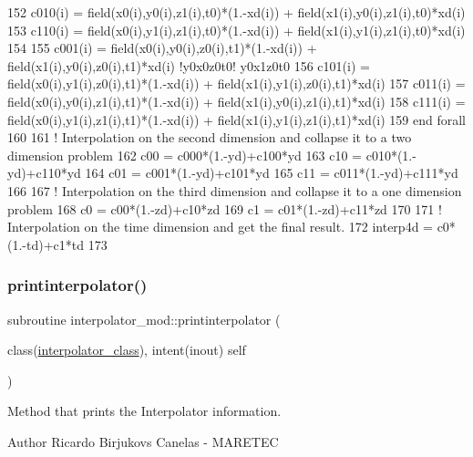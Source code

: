 \begin{DoxyCode}
152         c010(i) = field(x0(i),y0(i),z1(i),t0)*(1.-xd(i)) + field(x1(i),y0(i),z1(i),t0)*xd(i)
153         c110(i) = field(x0(i),y1(i),z1(i),t0)*(1.-xd(i)) + field(x1(i),y1(i),z1(i),t0)*xd(i)
154 
155         c001(i) = field(x0(i),y0(i),z0(i),t1)*(1.-xd(i)) + field(x1(i),y0(i),z0(i),t1)*xd(i) \textcolor{comment}{!y0x0z0t0! 
       y0x1z0t0}
156         c101(i) = field(x0(i),y1(i),z0(i),t1)*(1.-xd(i)) + field(x1(i),y1(i),z0(i),t1)*xd(i)
157         c011(i) = field(x0(i),y0(i),z1(i),t1)*(1.-xd(i)) + field(x1(i),y0(i),z1(i),t1)*xd(i)
158         c111(i) = field(x0(i),y1(i),z1(i),t1)*(1.-xd(i)) + field(x1(i),y1(i),z1(i),t1)*xd(i)
159 \textcolor{keywordflow}{    end forall}
160     
161     \textcolor{comment}{! Interpolation on the second dimension and collapse it to a two dimension problem}
162     c00 = c000*(1.-yd)+c100*yd
163     c10 = c010*(1.-yd)+c110*yd
164     c01 = c001*(1.-yd)+c101*yd
165     c11 = c011*(1.-yd)+c111*yd
166 
167     \textcolor{comment}{! Interpolation on the third dimension and collapse it to a one dimension problem}
168     c0 = c00*(1.-zd)+c10*zd
169     c1 = c01*(1.-zd)+c11*zd
170 
171     \textcolor{comment}{! Interpolation on the time dimension and get the final result.}
172     interp4d = c0*(1.-td)+c1*td
173 
\end{DoxyCode}
\mbox{\label{namespaceinterpolator__mod_a9b149bc8a3da5d1864b8c049f8b00697}} 
\subsubsection{\texorpdfstring{printinterpolator()}{printinterpolator()}}
{\footnotesize\ttfamily subroutine interpolator\+\_\+mod\+::printinterpolator (\begin{DoxyParamCaption}\item[{class(\mbox{\hyperlink{structinterpolator__mod_1_1interpolator__class}{interpolator\+\_\+class}}), intent(inout)}]{self }\end{DoxyParamCaption})\hspace{0.3cm}{\ttfamily [private]}}



Method that prints the Interpolator information. 

\begin{DoxyAuthor}{Author}
Ricardo Birjukovs Canelas -\/ M\+A\+R\+E\+T\+EC 
\end{DoxyAuthor}


